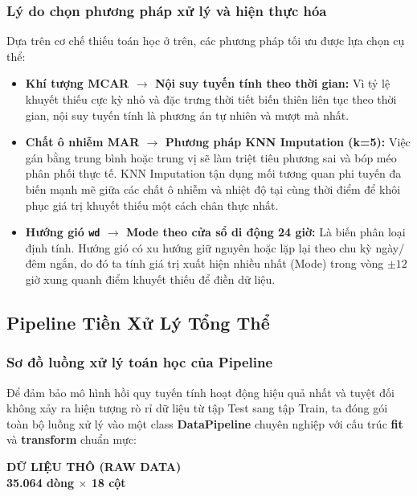 \documentclass[12pt,a4paper]{article}
\begin{document}
\subsubsection{Lý do chọn phương pháp xử lý và hiện thực hóa}
Dựa trên cơ chế thiếu toán học ở trên, các phương pháp tối ưu được lựa chọn cụ thể:
\begin{itemize}
    \item \textbf{Khí tượng MCAR $\rightarrow$ Nội suy tuyến tính theo thời gian:} Vì tỷ lệ khuyết thiếu cực kỳ nhỏ và đặc trưng thời tiết biến thiên liên tục theo thời gian, nội suy tuyến tính là phương án tự nhiên và mượt mà nhất.
    \item \textbf{Chất ô nhiễm MAR $\rightarrow$ Phương pháp KNN Imputation (k=5):} Việc gán bằng trung bình hoặc trung vị sẽ làm triệt tiêu phương sai và bóp méo phân phối thực tế. KNN Imputation tận dụng mối tương quan phi tuyến đa biến mạnh mẽ giữa các chất ô nhiễm và nhiệt độ tại cùng thời điểm để khôi phục giá trị khuyết thiếu một cách chân thực nhất.
    \item \textbf{Hướng gió \texttt{wd} $\rightarrow$ Mode theo cửa sổ di động 24 giờ:} Là biến phân loại định tính. Hướng gió có xu hướng giữ nguyên hoặc lặp lại theo chu kỳ ngày/đêm ngắn, do đó ta tính giá trị xuất hiện nhiều nhất (Mode) trong vòng $\pm 12$ giờ xung quanh điểm khuyết thiếu để điền dữ liệu.
\end{itemize}

\subsection{Pipeline Tiền Xử Lý Tổng Thể}

\subsubsection{Sơ đồ luồng xử lý toán học của Pipeline}
Để đảm bảo mô hình hồi quy tuyến tính hoạt động hiệu quả nhất và tuyệt đối không xảy ra hiện tượng rò rỉ dữ liệu từ tập Test sang tập Train, ta đóng gói toàn bộ luồng xử lý vào một class \textbf{DataPipeline} chuyên nghiệp với cấu trúc \textbf{fit} và \textbf{transform} chuẩn mực:

\begin{center}
\begin{tcolorbox}[
    enhanced,
    colback=HCMUSBlue,
    colframe=HCMUSBlue,
    coltitle=white,
    fonttitle=\bfseries\large,
    halign=center,
    valign=center,
    arc=4pt,
    boxrule=1pt,
    width=0.7\textwidth
]
    \centering
    \bfseries \color{white} DỮ LIỆU THÔ (RAW DATA)\\
    \textnormal{\small 35.064 dòng $\times$ 18 cột}
\end{tcolorbox}
\end{center}
\end{document}
